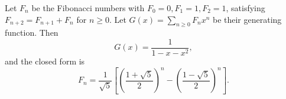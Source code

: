 Let $F_n$ be the Fibonacci numbers with $F_0 = 0, F_1 = 1, F_2 = 1$, satisfying $F_{n+2} = F_{n+1} + F_n$ for $n \geq 0$. Let $G(x) = \sum_{n \geq 0} F_n x^n$ be their generating function. Then
$$G(x) = \frac{1}{1 - x - x^2},$$
and the closed form is
$$F_n = \frac{1}{\sqrt{5}} \left[ \left(\frac{1+\sqrt{5}}{2}\right)^n - \left(\frac{1-\sqrt{5}}{2}\right)^n \right].$$
